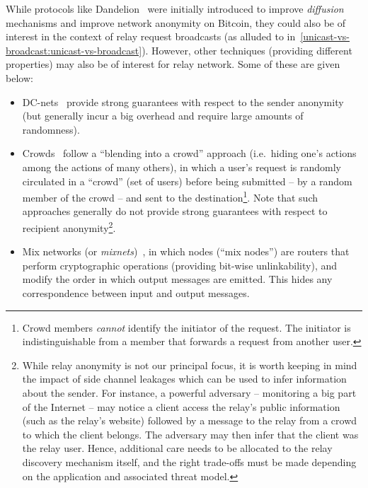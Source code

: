 
While protocols like Dandelion~\cite{DBLP:journals/pomacs/Venkatakrishnan17,DBLP:journals/pomacs/FantiVBDBMV18} were initially introduced to improve \emph{diffusion} mechanisms and improve network anonymity on Bitcoin, they could also be of interest in the context of relay request broadcasts (as alluded to in~\cref{unicast-vs-broadcast:unicast-vs-broadcast}).
However, other techniques (providing different properties) may also be of interest for relay network. Some of these are given below:
\begin{itemize}
    \item DC-nets~\cite{DBLP:journals/joc/Chaum88} provide strong guarantees with respect to the sender anonymity (but generally incur a big overhead and require large amounts of randomness).
    \item Crowds~\cite{DBLP:journals/tissec/ReiterR98} follow a ``blending into a crowd'' approach (i.e.~hiding one's actions among the actions of many others), in which a user's request is randomly circulated in a ``crowd'' (set of users) before being submitted -- by a random member of the crowd -- and sent to the destination\footnote{Crowd members \emph{cannot} identify the initiator of the request. The initiator is indistinguishable from a member that forwards a request from another user.}. Note that such approaches generally do not provide strong guarantees with respect to recipient anonymity\footnote{While relay anonymity is not our principal focus, it is worth keeping in mind the impact of side channel leakages which can be used to infer information about the sender. For instance, a powerful adversary -- monitoring a big part of the Internet -- may notice a client access the relay's public information (such as the relay's website) followed by a message to the relay from a crowd to which the client belongs. The adversary may then infer that the client was the relay user. Hence, additional care needs to be allocated to the relay discovery mechanism itself, and the right trade-offs must be made depending on the application and associated threat model.}.
    \item Mix networks (or \emph{mixnets})~\cite{DBLP:series/ais/Chaum03}, in which nodes (``mix nodes'') are routers that perform cryptographic operations (providing bit-wise unlinkability), and modify the order in which output messages are emitted. This hides any correspondence between input and output messages.

\end{itemize}
